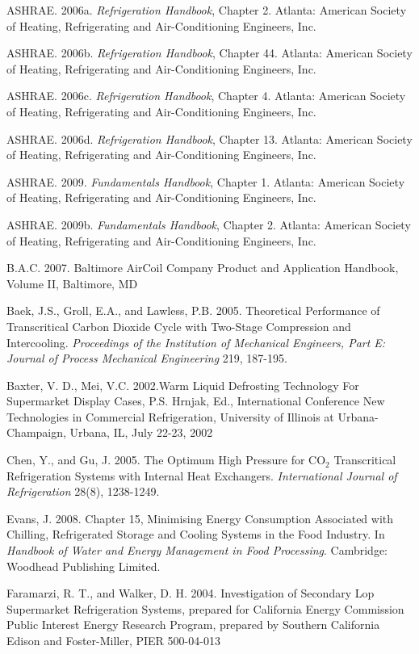 ASHRAE. 2006a. \emph{Refrigeration Handbook}, Chapter 2. Atlanta: American Society of Heating, Refrigerating and Air-Conditioning Engineers, Inc.

ASHRAE. 2006b. \emph{Refrigeration Handbook}, Chapter 44. Atlanta: American Society of Heating, Refrigerating and Air-Conditioning Engineers, Inc.

ASHRAE. 2006c. \emph{Refrigeration Handbook}, Chapter 4. Atlanta: American Society of Heating, Refrigerating and Air-Conditioning Engineers, Inc.

ASHRAE. 2006d. \emph{Refrigeration Handbook}, Chapter 13. Atlanta: American Society of Heating, Refrigerating and Air-Conditioning Engineers, Inc.

ASHRAE. 2009. \emph{Fundamentals Handbook}, Chapter 1. Atlanta: American Society of Heating, Refrigerating and Air-Conditioning Engineers, Inc.

ASHRAE. 2009b. \emph{Fundamentals Handbook}, Chapter 2. Atlanta: American Society of Heating, Refrigerating and Air-Conditioning Engineers, Inc.

B.A.C. 2007. Baltimore AirCoil Company Product and Application Handbook, Volume II, Baltimore, MD

Baek, J.S., Groll, E.A., and Lawless, P.B. 2005. Theoretical Performance of Transcritical Carbon Dioxide Cycle with Two-Stage Compression and Intercooling. \emph{Proceedings of the Institution of Mechanical Engineers, Part E: Journal of Process Mechanical Engineering} 219, 187-195.

Baxter, V. D., Mei, V.C. 2002.Warm Liquid Defrosting Technology For Supermarket Display Cases, P.S. Hrnjak, Ed., International Conference New Technologies in Commercial Refrigeration, University of Illinois at Urbana-Champaign, Urbana, IL, July 22-23, 2002

Chen, Y., and Gu, J. 2005. The Optimum High Pressure for CO\(_{2}\) Transcritical Refrigeration Systems with Internal Heat Exchangers. \emph{International Journal of Refrigeration} 28(8), 1238-1249.

Evans, J. 2008. Chapter 15, Minimising Energy Consumption Associated with Chilling, Refrigerated Storage and Cooling Systems in the Food Industry. In \emph{Handbook of Water and Energy Management in Food Processing}. Cambridge:~ Woodhead Publishing Limited.

Faramarzi, R. T., and Walker, D. H. 2004. Investigation of Secondary Lop Supermarket Refrigeration Systems, prepared for California Energy Commission Public Interest Energy Research Program, prepared by Southern California Edison and Foster-Miller, PIER 500-04-013

